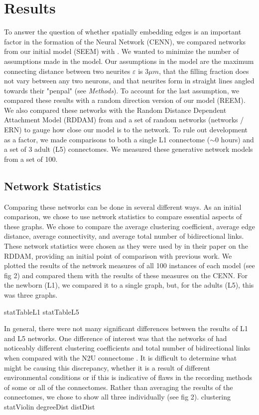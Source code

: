 \section{Results}

To answer the question of whether spatially embedding edges is an important factor in the formation of the \ce Neural Network (CENN), we compared networks from our initial model (SEEM) with \ce. 
We wanted to minimize the number of assumptions made in the model. 
Our assumptions in the model are the maximum connecting distance between two neurites $\varepsilon$ is $3 \mu m$, that the filling fraction does not vary between any two neurons, and that neurites form in straight lines angled towards their "penpal" (see \textit{Methods}).
To account for the last assumption, we compared these results with a random direction version of our model (REEM). 
We also compared these networks with the Random Distance Dependent Attachment Model (RDDAM) from \cite{Itzhack} and a set of random networks (\er networks / ERN) to gauge how close our model is to the \ce network. 
To rule out development as a factor, we made comparisons to both a single L1 connectome ($\sim 0$ hours) and a set of 3 adult (L5) connectomes. 
We measured these generative network models from a set of 100.

\subsection{Network Statistics}
Comparing these networks can be done in several different ways. As an initial comparison, we chose to use network statistics to compare essential aspects of these graphs. We chose to compare the average clustering coefficient, average edge distance, average connectivity, and average total number of bidirectional links. These network statistics were chosen as they were used by \cite{Itzhack} in their paper on the RDDAM, providing an initial point of comparison with previous work. We plotted the results of the network measures of all 100 instances of each model (see fig 2) and compared them with the results of these measures on the CENN. For the newborn (L1), we compared it to a single graph, but, for the adults (L5), this was three graphs.

{statTableL1}
{statTableL5}  

In general, there were not many significant differences between the results of L1 and L5 networks. One difference of interest was that the networks of \cite{Witvliet} had noticeably different clustering coefficients and total number of bidirectional links when compared with the N2U connectome \citep{Durbin}.
It is difficult to determine what might be causing this discrepancy, whether it is a result of different environmental conditions or if this is indicative of flaws in the recording methods of some or all of the connectomes. Rather than averaging the results of the connectomes, we chose to show all three individually (see fig 2). 
{clustering}
{statViolin}
{degreeDist}
{distDist}


